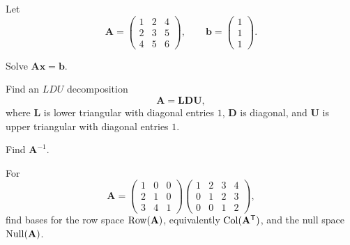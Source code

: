 \documentclass[11pt,oneside]{article}
\begin{document}
\begin{problem}
Let
\[
\mathbf A=
\begin{pmatrix}
1&2&4\\
2&3&5\\
4&5&6
\end{pmatrix},
\qquad
\mathbf b=
\begin{pmatrix}
1\\1\\1
\end{pmatrix}.
\]
\begin{problemsubparts}
\item Solve $\mathbf A\mathbf x=\mathbf b$.
\item Find an $LDU$ decomposition
\[
\mathbf A=\mathbf L\mathbf D\mathbf U,
\]
where $\mathbf L$ is lower triangular with diagonal entries $1$, $\mathbf D$ is diagonal, and $\mathbf U$ is upper triangular with diagonal entries $1$.
\item Find $\mathbf A^{-1}$.
\end{problemsubparts}
\end{problem}

\begin{problem}
For
\[
\mathbf A=
\begin{pmatrix}
1&0&0\\
2&1&0\\
3&4&1
\end{pmatrix}
\begin{pmatrix}
1&2&3&4\\
0&1&2&3\\
0&0&1&2
\end{pmatrix},
\]
find bases for the row space $\operatorname{Row}(\mathbf A)$, equivalently $\operatorname{Col}(\mathbf A^{\mathsf T})$, and the null space $\operatorname{Null}(\mathbf A)$.
\end{problem}
\end{document}
